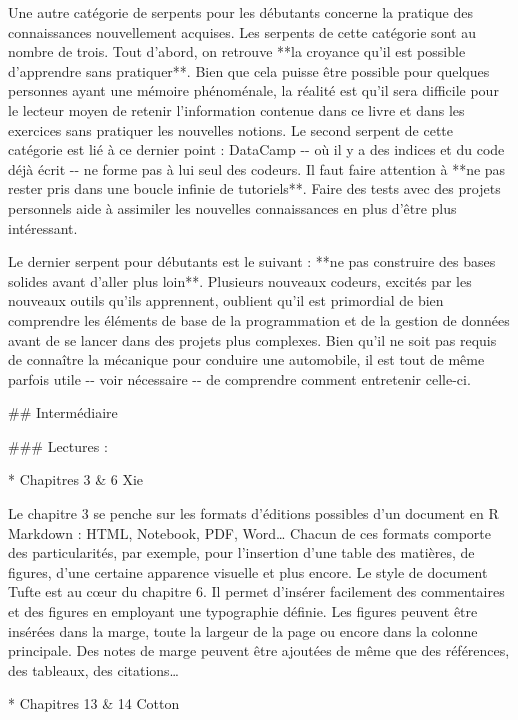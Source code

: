 \documentclass[
  letterpaper,
]{scrbook}
\begin{document}
Une autre catégorie de serpents pour les débutants concerne la pratique
des connaissances nouvellement acquises. Les serpents de cette catégorie
sont au nombre de trois. Tout d'abord, on retrouve **la croyance qu'il
est possible d'apprendre sans pratiquer**. Bien que cela puisse être
possible pour quelques personnes ayant une mémoire phénoménale, la
réalité est qu'il sera difficile pour le lecteur moyen de retenir
l'information contenue dans ce livre et dans les exercices sans
pratiquer les nouvelles notions. Le second serpent de cette catégorie
est lié à ce dernier point : DataCamp -\/- où il y a des indices et du
code déjà écrit -\/- ne forme pas à lui seul des codeurs. Il faut faire
attention à **ne pas rester pris dans une boucle infinie de tutoriels**.
Faire des tests avec des projets personnels aide à assimiler les
nouvelles connaissances en plus d'être plus intéressant.

Le dernier serpent pour débutants est le suivant : **ne pas construire
des bases solides avant d'aller plus loin**. Plusieurs nouveaux codeurs,
excités par les nouveaux outils qu'ils apprennent, oublient qu'il est
primordial de bien comprendre les éléments de base de la programmation
et de la gestion de données avant de se lancer dans des projets plus
complexes. Bien qu'il ne soit pas requis de connaître la mécanique pour
conduire une automobile, il est tout de même parfois utile -\/- voir
nécessaire -\/- de comprendre comment entretenir celle-ci.

\#\# Intermédiaire

\#\#\# Lectures :

* Chapitres 3 \& 6 Xie

Le chapitre 3 se penche sur les formats d'éditions possibles d'un
document en R Markdown : HTML, Notebook, PDF, Word\ldots{} Chacun de ces
formats comporte des particularités, par exemple, pour l'insertion d'une
table des matières, de figures, d'une certaine apparence visuelle et
plus encore. Le style de document Tufte est au cœur du chapitre 6. Il
permet d'insérer facilement des commentaires et des figures en employant
une typographie définie. Les figures peuvent être insérées dans la
marge, toute la largeur de la page ou encore dans la colonne principale.
Des notes de marge peuvent être ajoutées de même que des références, des
tableaux, des citations\ldots{}

* Chapitres 13 \& 14 Cotton
\end{document}
